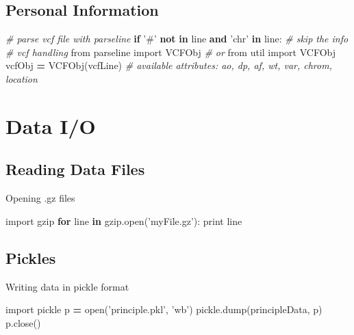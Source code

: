 \documentclass[]{book}
\newenvironment{Shaded}{\begin{snugshade}}{\end{snugshade}}
\newcommand{\KeywordTok}[1]{\textcolor[rgb]{0.13,0.29,0.53}{\textbf{#1}}}
\newcommand{\StringTok}[1]{\textcolor[rgb]{0.31,0.60,0.02}{#1}}
\newcommand{\ImportTok}[1]{#1}
\newcommand{\CommentTok}[1]{\textcolor[rgb]{0.56,0.35,0.01}{\textit{#1}}}
\newcommand{\ControlFlowTok}[1]{\textcolor[rgb]{0.13,0.29,0.53}{\textbf{#1}}}
\newcommand{\OperatorTok}[1]{\textcolor[rgb]{0.81,0.36,0.00}{\textbf{#1}}}
\newcommand{\BuiltInTok}[1]{#1}
\newcommand{\NormalTok}[1]{#1}
\begin{document}
\section{Personal Information}\label{personal-information}

\begin{Shaded}
\begin{Highlighting}[]
\CommentTok{# parse vcf file with parseline}
\ControlFlowTok{if} \StringTok{'#'} \KeywordTok{not} \KeywordTok{in}\NormalTok{ line }\KeywordTok{and} \StringTok{'chr'} \KeywordTok{in}\NormalTok{ line: }\CommentTok{# skip the info}
\CommentTok{# vcf handling}
\ImportTok{from}\NormalTok{ parseline }\ImportTok{import}\NormalTok{ VCFObj}
\CommentTok{# or}
\ImportTok{from}\NormalTok{ util }\ImportTok{import}\NormalTok{ VCFObj}
\NormalTok{vcfObj }\OperatorTok{=}\NormalTok{ VCFObj(vcfLine)}
\CommentTok{# available attributes: ao, dp, af, wt, var, chrom, location}
\end{Highlighting}
\end{Shaded}

\chapter{Data I/O}\label{io}

\section{Reading Data Files}\label{reading-data-files}

Opening .gz files

\begin{Shaded}
\begin{Highlighting}[]
\ImportTok{import}\NormalTok{ gzip}
\ControlFlowTok{for}\NormalTok{ line }\KeywordTok{in}\NormalTok{ gzip.}\BuiltInTok{open}\NormalTok{(}\StringTok{'myFile.gz'}\NormalTok{):}
    \BuiltInTok{print}\NormalTok{ line}
\end{Highlighting}
\end{Shaded}

\section{Pickles}\label{pickles}

Writing data in pickle format

\begin{Shaded}
\begin{Highlighting}[]
\ImportTok{import}\NormalTok{ pickle}
\NormalTok{p }\OperatorTok{=} \BuiltInTok{open}\NormalTok{(}\StringTok{'principle.pkl'}\NormalTok{, }\StringTok{'wb'}\NormalTok{)}
\NormalTok{pickle.dump(principleData, p)}
\NormalTok{p.close()}
\end{Highlighting}
\end{Shaded}
\end{document}
